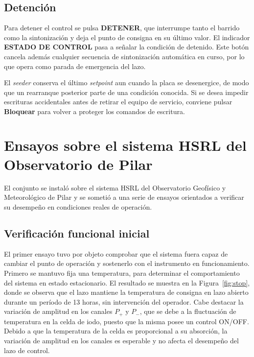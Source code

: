 \subsection{Detención}

Para detener el control se pulsa \textbf{DETENER}, que interrumpe tanto el barrido
como la sintonización y deja el punto de consigna en su último valor. El indicador
\textbf{ESTADO DE CONTROL} pasa a señalar la condición de detenido. Este botón
cancela además cualquier secuencia de sintonización automática en curso, por lo que
opera como parada de emergencia del lazo.

El \emph{seeder} conserva el último \emph{setpoint} aun cuando la placa se
desenergice, de modo que un rearranque posterior parte de una condición conocida. Si
se desea impedir escrituras accidentales antes de retirar el equipo de servicio,
conviene pulsar \textbf{Bloquear} para volver a proteger los comandos de escritura.

\section{Ensayos sobre el sistema HSRL del Observatorio de Pilar}
\label{sec:me-ensayos}

El conjunto se instaló sobre el sistema HSRL del Observatorio Geofísico y Meteorológico de Pilar y se sometió a una serie de ensayos
orientados a verificar su desempeño en condiciones reales de operación.

\subsection{Verificación funcional inicial}

El primer ensayo tuvo por objeto comprobar que el sistema fuera capaz de cambiar el punto de operación y sostenerlo con el instrumento en funcionamiento. Primero se mantuvo fija una temperatura, para determinar el comportamiento del sistema en estado estacionario. El resultado se muestra en la Figura~\ref{fig:stop}, donde se observa que el lazo mantiene la temperatura de consigna en lazo abierto durante un período de 13 horas, sin intervención del operador. Cabe destacar la variación de amplitud en los canales $P_+$ y $P_-$, que se debe a la fluctuación de temperatura en la celda de iodo, puesto que la misma posee un control ON/OFF. Debido a que la temperatura de la celda es proporcional a su absorción, la variación de amplitud en los canales es esperable y no afecta el desempeño del lazo de control.

